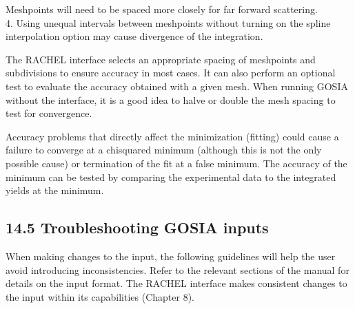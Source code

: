 \documentclass[10pt]{article}
\begin{document}
Meshpoints will need to be spaced more closely for far forward scattering.\\
4. Using unequal intervals between meshpoints without turning on the spline interpolation option may cause divergence of the integration.

The RACHEL interface selects an appropriate spacing of meshpoints and subdivisions to ensure accuracy in most cases. It can also perform an optional test to evaluate the accuracy obtained with a given mesh. When running GOSIA without the interface, it is a good idea to halve or double the mesh spacing to test for convergence.

Accuracy problems that directly affect the minimization (fitting) could cause a failure to converge at a chisquared minimum (although this is not the only possible cause) or termination of the fit at a false minimum. The accuracy of the minimum can be tested by comparing the experimental data to the integrated yields at the minimum.

\subsection*{14.5 Troubleshooting GOSIA inputs}
When making changes to the input, the following guidelines will help the user avoid introducing inconsistencies. Refer to the relevant sections of the manual for details on the input format. The RACHEL interface makes consistent changes to the input within its capabilities (Chapter 8).
\end{document}
